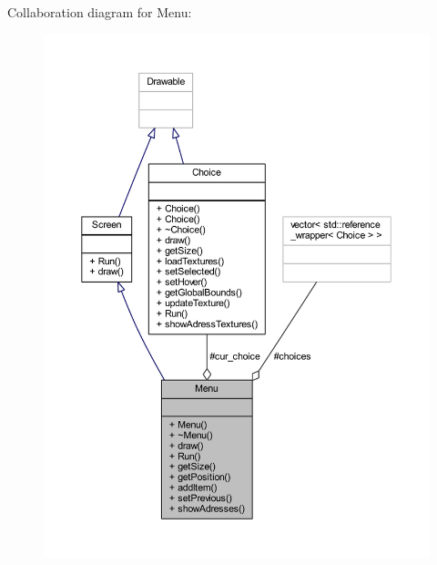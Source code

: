 Collaboration diagram for Menu\+:\nopagebreak
\begin{figure}[H]
\begin{center}
\leavevmode
\includegraphics[width=350pt]{class_menu__coll__graph}
\end{center}
\end{figure}
